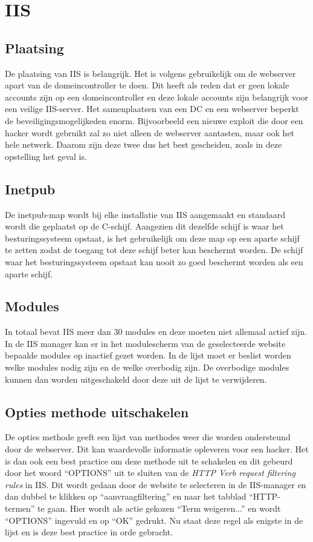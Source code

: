 \documentclass[pdftex,a4paper,12pt]{report}
\begin{document}
\section{IIS}
\subsection{Plaatsing}
De plaatsing van IIS is belangrijk. Het is volgens \cite{Microsoft2013} gebruikelijk om de webserver apart van de domeincontroller te doen. Dit heeft als reden dat er geen lokale accounts zijn op een domeincontroller en deze lokale accounts zijn belangrijk voor een veilige IIS-server. Het samenplaatsen van een DC en een webserver beperkt de beveiligingsmogelijkeden enorm. Bijvoorbeeld een nieuwe exploit die door een hacker wordt gebruikt zal zo niet alleen de webserver aantasten, maar ook het hele netwerk. Daarom zijn deze twee dus het best gescheiden, zoals in deze opstelling het geval is.

\subsection{Inetpub}
De inetpub-map wordt bij elke installatie van IIS aangemaakt en standaard wordt die geplaatst op de C-schijf. Aangezien dit dezelfde schijf is waar het besturingssysteem opstaat, is het gebruikelijk om deze map op een aparte schijf te zetten zodat de toegang tot deze schijf beter kan beschermt worden. De schijf waar het besturingssysteem opstaat kan nooit zo goed beschermt worden als een aparte schijf. \citep{Microsoft2013}

\subsection{Modules}
In totaal bevat IIS meer dan 30 modules en deze moeten niet allemaal actief zijn. In de IIS manager kan er in het modulescherm van de geselecteerde website bepaalde modules op inactief gezet worden. In de lijst moet er beslist worden welke modules nodig zijn en de welke overbodig zijn. De overbodige modules kunnen dan worden uitgeschakeld door deze uit de lijst te verwijderen. 

\subsection{Opties methode uitschakelen}
De opties methode geeft een lijst van methodes weer die worden ondersteund door de webserver. Dit kan waardevolle informatie opleveren voor een hacker. Het is dan ook een best practice om deze methode uit te schakelen en dit gebeurd door het woord "`OPTIONS"' uit te sluiten van de \textit{HTTP Verb request filtering rules} in IIS. Dit wordt gedaan door de website te selecteren in de IIS-manager en dan dubbel te klikken op "`aanvraagfiltering"' en naar het tabblad "`HTTP-termen"' te gaan. Hier wordt als actie gekozen "`Term weigeren..."' en wordt "`OPTIONS"' ingevuld en op "`OK"' gedrukt. Nu staat deze regel als enigste in de lijst en is deze best practice in orde gebracht.
\end{document}
